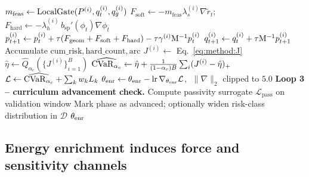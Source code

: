 \begin{algorithm}[t]
\begin{algorithmic}[1]
      \State $m_{\mathrm{feas}}\leftarrow\mathrm{LocalGate}(P^{(i)},q_t^{(i)},q_g^{(i)})$
      \State $F_{\mathrm{soft}} \leftarrow -m_{\mathrm{feas}}\lambda_s^{(i)} \nabla\tilde r_t$;\;
             $F_{\mathrm{hard}} \leftarrow -\lambda_h^{(i)}\,
                                          b_{\mathrm{sp}}'(\phi_t) \nabla\phi_t$
      \State $p_{t+1}^{(i)} \leftarrow p_t^{(i)}
              + \tau(F_{\mathrm{geom}} + F_{\mathrm{soft}}
                     + F_{\mathrm{hard}})
              - \tau\gamma^{(i)} \mathrm{M}^{-1}p_t^{(i)}$
      \State $q_{t+1}^{(i)} \leftarrow q_t^{(i)} + \tau \mathrm{M}^{-1}p_{t+1}^{(i)}$
      \State Accumulate $\mathrm{cum\_risk}, \mathrm{hard\_count}, \mathrm{arc}$
    \EndFor
    \State $J^{(i)} \leftarrow$ Eq.~\eqref{eq:method:J}
    \State $\hat\eta \leftarrow \widehat{Q}_{\alpha_c}(\{J^{(i)}\}_{i=1}^B)$
    \State $\widehat{\mathrm{CVaR}_{\alpha_c}} \leftarrow
           \hat\eta + \tfrac{1}{(1-\alpha_c)B}\sum_i (J^{(i)} - \hat\eta)_+$
    \State $\mathcal{L} \leftarrow \widehat{\mathrm{CVaR}_{\alpha_c}}
                + \sum_{k} w_k L_k$
    \State $\theta_{\rm enr} \leftarrow \theta_{\rm enr} - \mathrm{lr}\,
            \nabla_{\theta_{\rm enr}}\mathcal{L}$,
            $\;\|\nabla\|_2$ clipped to $5.0$
  \EndFor
  \Statex \hspace{0.7em}\textbf{Loop 3 -- curriculum advancement check.}
  \State Compute passivity surrogate $\mathcal{L}_{\mathrm{pass}}$ on
         validation window
    \State Mark phase as advanced; optionally widen risk-class
           distribution in $\mathcal{D}$
  \EndIf
\EndFor
\State \Return $\theta_{\rm enr}$
\end{algorithmic}
\end{algorithm}

\subsection{Energy enrichment induces force and sensitivity channels}

